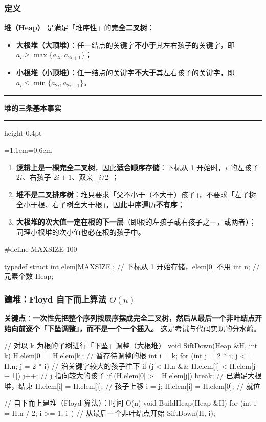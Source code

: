 \documentclass[11pt,openany,UTF8]{ctexbook}
\newcommand{\callouthead}[2]{%
  \par\addvspace{7pt}\noindent
  {\color{#1}\rule[-0.15em]{3pt}{1.05em}}\hspace{0.5em}%
  {\bfseries\color{#1}#2}\par\nobreak\vspace{-0.35em}%
  {\color{rulesep}\hrule height 0.4pt}\nobreak\vspace{0.45em}%
  \begingroup\small\setlength{\parindent}{0pt}%
  \leftskip=1.1em\rightskip=0.6em\noindent\ignorespaces}
\newcommand{\calloutend}{\par\endgroup\addvspace{7pt}}
\newenvironment{callkey}[1]{\callouthead{keybar}{#1}}{\calloutend}
\begin{document}
\subsubsection{定义}

\textbf{堆（Heap）} 是满足「堆序性」的\textbf{完全二叉树}：

\begin{itemize}
\item \textbf{大根堆（大顶堆）}：任一结点的关键字\textbf{不小于}其左右孩子的关键字，即 $a_i\ge\max\{a_{2i},a_{2i+1}\}$；
\item \textbf{小根堆（小顶堆）}：任一结点的关键字\textbf{不大于}其左右孩子的关键字，即 $a_i\le\min\{a_{2i},a_{2i+1}\}$。
\end{itemize}
\begin{callkey}{堆的三条基本事实}
\begin{enumerate}
\item \textbf{逻辑上是一棵完全二叉树}，因此\textbf{适合顺序存储}：下标从 1 开始时，$i$ 的左孩子 $2i$、右孩子 $2i+1$、双亲 $\lfloor i/2\rfloor$；
\item \textbf{堆不是二叉排序树}：堆只要求「父不小于（不大于）孩子」，不要求「左子树全小于根、右子树全大于根」，因此中序遍历\textbf{不有序}；
\item \textbf{大根堆的次大值一定在根的下一层}（即根的左孩子或右孩子之一，或两者）；同理小根堆的次小值也必在根的孩子中。
\end{enumerate}
\end{callkey}

\begin{codebox}
#define MAXSIZE 100

typedef struct {
    int elem[MAXSIZE];   // 下标从 1 开始存储，elem[0] 不用
    int n;               // 元素个数
} Heap;
\end{codebox}

\subsubsection{建堆：Floyd 自下而上算法 $O(n)$}

\textbf{关键点}：\textbf{一次性先把整个序列按层序摆成完全二叉树，然后从最后一个非叶结点开始向前逐个「下坠调整」，而不是一个一个插入。} 这是考试与代码实现的分水岭。

\begin{codebox}
// 对以 k 为根的子树进行「下坠」调整（大根堆）
void SiftDown(Heap &H, int k) {
    H.elem[0] = H.elem[k];                       // 暂存待调整的根
    int i = k;
    for (int j = 2 * i; j <= H.n; j = 2 * i) {   // 沿关键字较大的孩子往下
        if (j < H.n && H.elem[j] < H.elem[j + 1]) j++;   // j 指向较大的孩子
        if (H.elem[0] >= H.elem[j]) break;       // 已满足大根堆，结束
        H.elem[i] = H.elem[j];                   // 孩子上移
        i = j;
    }
    H.elem[i] = H.elem[0];                       // 就位
}

// 自下而上建堆（Floyd 算法）：时间 O(n)
void BuildHeap(Heap &H) {
    for (int i = H.n / 2; i >= 1; i--)   // 从最后一个非叶结点开始
        SiftDown(H, i);
}
\end{codebox}
\end{document}
